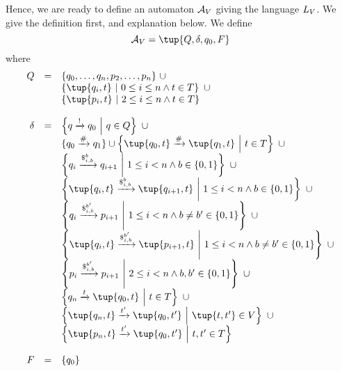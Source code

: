 \documentclass{article}
\begin{document}
Hence, we are ready to define an automaton $\mathcal{A}_V$ giving the language $L_V$.
We give the definition first, and explanation below.
We define
\[
    \cA_\vcons = \tup{Q, \delta, q_0, F}
\]
where
\[
    \begin{array}{rcl}
        Q &=& \set{q_0, \ldots, q_n, p_2, \ldots, p_n} \ \cup \\
          & & \setcomp{\tup{q_i, \tile}}
                      {0 \leq i \leq n \land \tile \in \tiles} \ \cup \\
          & & \setcomp{\tup{p_i, \tile}}
                      {2 \leq i \leq n \land \tile \in \tiles} \\
        \\
        \delta &=& \setcomp{q \xrightarrow{\resetchar} q_0}{q \in Q} \ \cup \\
               & & \set{q_0 \xrightarrow{\rowdelim} q_1} \cup
                   \setcomp{\tup{q_0, \tile}
                            \xrightarrow{\rowdelim}
                            \tup{q_1, \tile}}
                           {\tile \in \tiles} \ \cup \\
               & & \setcomp{q_i
                            \xrightarrow{\repl{i}{\bit}{\bit}}
                            q_{i+1}}
                           {1 \leq i < n \land \bit \in \set{0,1}} \ \cup \\
               & & \setcomp{\tup{q_i, \tile}
                            \xrightarrow{\repl{i}{\bit}{\bit}}
                            \tup{q_{i+1}, \tile}}
                           {1 \leq i < n \land \bit \in \set{0,1}} \ \cup \\
               & & \setcomp{q_i
                            \xrightarrow{\repl{i}{\bit}{\bit'}}
                            p_{i+1}}
                           {1 \leq i < n \land
                            \bit \neq \bit' \in \set{0,1}} \ \cup \\
               & & \setcomp{\tup{q_i, \tile}
                            \xrightarrow{\repl{i}{\bit}{\bit'}}
                            \tup{p_{i+1}, \tile}}
                           {1 \leq i < n \land
                            \bit \neq \bit' \in \set{0,1}} \ \cup \\
               & & \setcomp{p_i
                            \xrightarrow{\repl{i}{\bit}{\bit'}}
                            p_{i+1}}
                           {2 \leq i < n \land \bit, \bit' \in \set{0,1}} \ \cup \\
               & & \setcomp{q_n \xrightarrow{\tile} \tup{q_0, \tile}}
                           {\tile \in \tiles} \ \cup \\
               & & \setcomp{\tup{q_n, \tile}
                            \xrightarrow{\tile'}
                            \tup{q_0, \tile'}}
                           {\tup{\tile, \tile'} \in \vcons} \ \cup \\
               & & \setcomp{\tup{p_n, \tile}
                            \xrightarrow{\tile'}
                            \tup{q_0, \tile'}}
                           {\tile, \tile' \in \tiles} \\
        \\
        F &=& \set{q_0}
    \end{array}
\]
\end{document}

